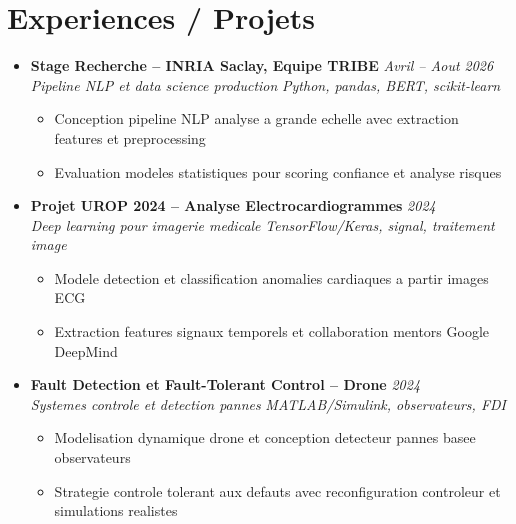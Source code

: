 \documentclass[a4paper,11pt]{article}
\begin{document}
\section{Experiences / Projets}
\begin{itemize}[leftmargin=*, label={-}]

\item \textbf{Stage Recherche -- INRIA Saclay, Equipe TRIBE} \hfill \textit{Avril -- Aout 2026} \\
\textit{Pipeline NLP et data science production} \hfill \textit{Python, pandas, BERT, scikit-learn}
\vspace{-2pt}
    \begin{itemize}[leftmargin=0.4cm, nosep, label=\tiny$\bullet$]
        \item \small{Conception pipeline NLP analyse a grande echelle avec extraction features et preprocessing}
        \item \small{Evaluation modeles statistiques pour scoring confiance et analyse risques}
    \end{itemize}
\vspace{3pt}

\item \textbf{Projet UROP 2024 -- Analyse Electrocardiogrammes} \hfill \textit{2024} \\
\textit{Deep learning pour imagerie medicale} \hfill \textit{TensorFlow/Keras, signal, traitement image}
\vspace{-2pt}
    \begin{itemize}[leftmargin=0.4cm, nosep, label=\tiny$\bullet$]
        \item \small{Modele detection et classification anomalies cardiaques a partir images ECG}
        \item \small{Extraction features signaux temporels et collaboration mentors Google DeepMind}
    \end{itemize}
\vspace{3pt}

\item \textbf{Fault Detection et Fault-Tolerant Control -- Drone} \hfill \textit{2024} \\
\textit{Systemes controle et detection pannes} \hfill \textit{MATLAB/Simulink, observateurs, FDI}
\vspace{-2pt}
    \begin{itemize}[leftmargin=0.4cm, nosep, label=\tiny$\bullet$]
        \item \small{Modelisation dynamique drone et conception detecteur pannes basee observateurs}
        \item \small{Strategie controle tolerant aux defauts avec reconfiguration controleur et simulations realistes}
    \end{itemize}
\vspace{3pt}


\end{itemize}
\end{document}
